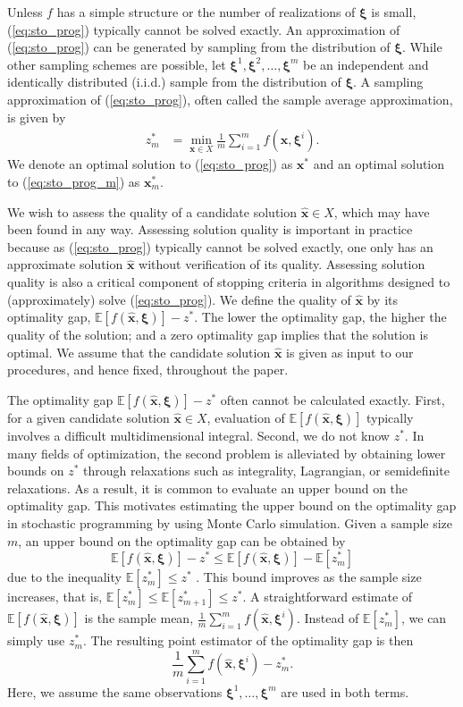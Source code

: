 \documentclass[12pt]{article}
\newcommand{\e}[1]{\mathbb{E} \left[ #1 \right]
}
\newcommand{\x}{\mathbf{x}}
\newcommand{\xh}{{\hat{\x}}}
\newcommand{\xs}{\x^*}
\newcommand{\xit}{\boldsymbol{\xi}}
\newcommand{\xiti}{\xit^i}
\newcommand{\zs}{z^*}
\begin{document}
Unless $f$ has a simple structure or the number of realizations of $\xit$ is small, (\ref{eq:sto_prog}) typically cannot be solved exactly. 
An approximation of (\ref{eq:sto_prog}) can be generated by sampling from the distribution of $\xit$.
While other sampling schemes are possible, let $\xit^1, \xit^2, \dots, \xit^m$ be an independent and identically distributed (i.i.d.) sample from the distribution of $\xit$.
A sampling approximation of (\ref{eq:sto_prog}), often called the sample average approximation, is given by
\begin{align} \tag{SP$_m$} \label{eq:sto_prog_m}
	z_m^* & = \min_{\x \in X} \frac{1}{m} \sum_{i=1}^m f(\x,\xiti).
\end{align}
We denote an optimal solution to (\ref{eq:sto_prog}) as $\xs$ and an optimal solution to (\ref{eq:sto_prog_m}) as $\xs_m$.



We wish to assess the quality of a candidate solution $\xh \in X$, which may have been found in any way.
Assessing solution quality is important in practice because as (\ref{eq:sto_prog}) typically cannot be solved exactly, one only has an approximate solution $\xh$ without verification of its quality.
Assessing solution quality is also a critical component of stopping criteria in algorithms designed to (approximately) solve (\ref{eq:sto_prog}).
We define the quality of $\xh$ by its optimality gap, $\e{f(\xh,\xit)} - \zs$. 
The lower the optimality gap, the higher the quality of the solution; and a zero optimality gap implies that the solution is optimal. 
We assume that the candidate solution $\xh$ is given as input to our procedures, and hence fixed, throughout the paper. 


The optimality gap $\e{f(\xh,\xit)} - \zs$ often cannot be calculated exactly. First, for a given candidate solution $\xh \in X$, evaluation of $\e{f(\xh,\xit)}$ typically involves a difficult multidimensional integral. 
Second, we do not know $\zs$. 
In many fields of optimization, the second problem is alleviated by obtaining lower bounds on $\zs$ through relaxations such as integrality, Lagrangian, or semidefinite relaxations.
As a result, it is common to evaluate an upper bound on the optimality gap. 
This motivates estimating the upper bound on the optimality gap in stochastic programming by using Monte Carlo simulation.
Given a sample size $m$, an upper bound on the optimality gap can be obtained by $$
\e{f(\xh,\xit)} - \zs \leq \e{f(\xh,\xit)} - \e{\zs_m}
$$ 
due to the inequality $\e{\zs_m} \leq \zs$ \citep{Mak1999,norkin_pflug_ruszczynski_98}.
This bound improves as the sample size increases, that is, $\e{\zs_m} \leq \e{\zs_{m+1}} \leq \zs$.  
A straightforward estimate of $\e{f(\xh,\xit)}$ is the sample mean, $\frac{1}{m} \sum_{i=1}^m f(\xh,\xiti)$. 
Instead of $\e{\zs_m}$, we can simply use $\zs_m$.  
The resulting point estimator of the optimality gap is then 
$$
\frac{1}{m} \sum_{i=1}^m f(\xh,\xiti) - \zs_m.
$$ 
Here, we assume the same observations $\xit^1, \dots, \xit^m$ are used in both terms.  
\end{document}
